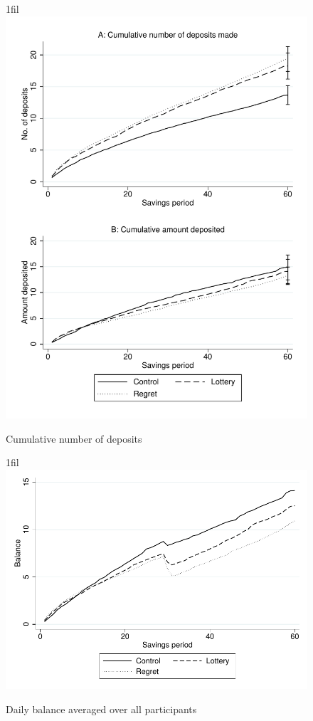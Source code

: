 \documentclass[11pt]{article}
\makeatletter
\newcommand*{\centerfloat}{%
  \parindent \z@
  \leftskip \z@ \@plus 1fil \@minus \textwidth
  \rightskip\leftskip
  \parfillskip \z@skip}
\makeatother
\begin{document}
		\begin{figure}[h]
		\centering
		\caption{Cumulative number of deposits}
		\centerfloat
		\includegraphics[width=\textwidth]{../../figures/line-cumdeposits.pdf}
		\end{figure}

		\begin{figure}[h]
		\centering
		\caption{Daily balance averaged over all participants}
		\centerfloat
		\includegraphics[width=\textwidth]{../../figures/line-balance.pdf}
		\end{figure}
\end{document}

